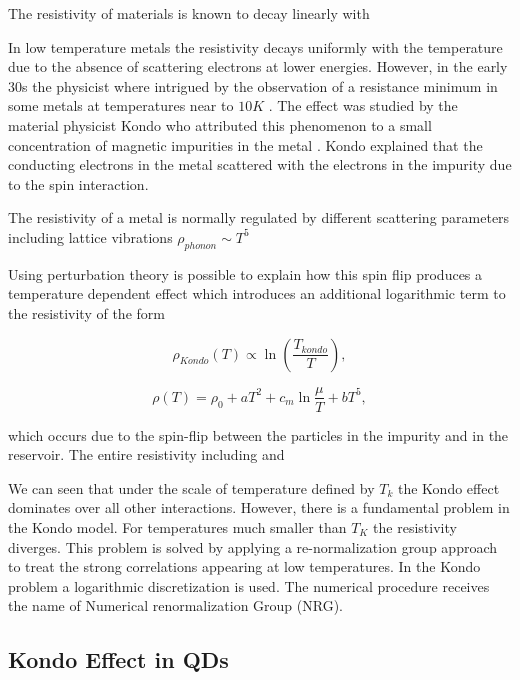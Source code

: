 The resistivity of materials is known to decay linearly with 

In low temperature metals the resistivity decays uniformly with the temperature due to the absence of scattering electrons at lower energies. However, in the early 30s the physicist where intrigued by the observation of a resistance minimum in some metals at temperatures near to $ 10K$ \cite{sindel_numerical_2005}.  The effect was studied by the material physicist  Kondo  who attributed this phenomenon to a small concentration of magnetic impurities in the metal \citep{hewson_kondo_1997}. Kondo explained that the conducting electrons in the metal scattered with the electrons in the impurity due to the spin interaction. 

The resistivity of a metal is normally regulated by different scattering parameters including lattice vibrations $\rho_{phonon} \sim T^5$


Using perturbation theory is possible to explain how this spin flip produces a  temperature dependent effect which  introduces an additional logarithmic term to the resistivity of the form

\begin{equation}
\rho_{Kondo}(T)  \propto \ln{\left( \frac{T_{kondo}}{T} \right)},
\label{logKondo}
\end{equation}

\begin{equation}
{\displaystyle \rho (T)=\rho _{0}+aT^{2}+c_{m}\ln {\frac {\mu }{T}}+bT^{5},}
\label{logKondo}
\end{equation}

which occurs due to the spin-flip between the particles in the impurity and in the reservoir. The entire resistivity including  and 

We can seen that under the scale of temperature defined by $T_k$ the Kondo effect dominates over all other interactions. However, there is a fundamental problem in the Kondo model. For temperatures much smaller than $T_K$ the resistivity diverges. This problem is solved by applying a re-normalization group approach to treat the strong correlations appearing at low temperatures. In the Kondo problem a logarithmic discretization is used. The numerical procedure receives the name of Numerical renormalization Group (NRG). 


\subsection{Kondo Effect in QDs}


